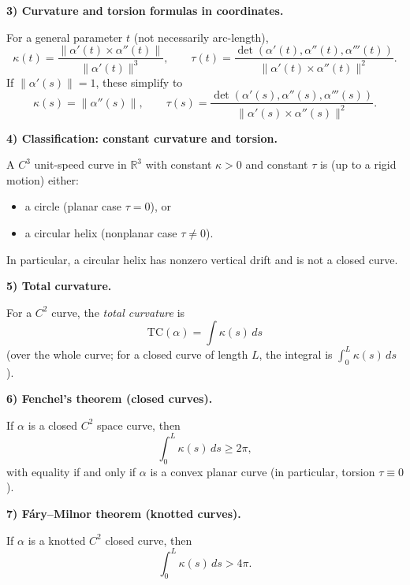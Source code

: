 \begin{solution}
	\par\medskip\noindent\textbf{3) Curvature and torsion formulas in coordinates.}\par\smallskip

	For a general parameter $t$ (not necessarily arc-length),
	\[
	\kappa(t)=\frac{\|\alpha'(t)\times\alpha''(t)\|}{\|\alpha'(t)\|^3},
	\qquad
	\tau(t)=\frac{\det(\alpha'(t),\alpha''(t),\alpha'''(t))}{\|\alpha'(t)\times\alpha''(t)\|^2}.
	\]
	If $\|\alpha'(s)\|=1$, these simplify to
	\[
	\kappa(s)=\|\alpha''(s)\|,
	\qquad
	\tau(s)=\frac{\det(\alpha'(s),\alpha''(s),\alpha'''(s))}{\|\alpha'(s)\times\alpha''(s)\|^2}.
	\]
	
	\par\medskip\noindent\textbf{4) Classification: constant curvature and torsion.}\par\smallskip

	A $C^3$ unit-speed curve in $\mathbb{R}^3$ with constant $\kappa>0$ and constant $\tau$ is (up to a rigid motion)
	either:
	\begin{itemize}
		\item a circle (planar case $\tau=0$), or
		\item a circular helix (nonplanar case $\tau\neq 0$).
	\end{itemize}
	In particular, a circular helix has nonzero vertical drift and is not a closed curve.
	
	\par\medskip\noindent\textbf{5) Total curvature.}\par\smallskip

	For a $C^2$ curve, the \emph{total curvature} is
	\[
	\mathrm{TC}(\alpha)=\int \kappa(s)\,ds
	\]
	(over the whole curve; for a closed curve of length $L$, the integral is $\int_0^L \kappa(s)\,ds$).
	
	\par\medskip\noindent\textbf{6) Fenchel's theorem (closed curves).}\par\smallskip

	If $\alpha$ is a closed $C^2$ space curve, then
	\[
	\int_0^L \kappa(s)\,ds \ge 2\pi,
	\]
	with equality if and only if $\alpha$ is a convex planar curve (in particular, torsion $\tau\equiv 0$).
	
	\par\medskip\noindent\textbf{7) F\'ary--Milnor theorem (knotted curves).}\par\smallskip

	If $\alpha$ is a knotted $C^2$ closed curve, then
	\[
	\int_0^L \kappa(s)\,ds > 4\pi.
	\]
	

\end{solution}
